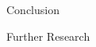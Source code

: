 \documentclass{beamer}
\begin{document}



\begin{frame}{Conclusion}
\end{frame}

\begin{frame}{Further Research}
\end{frame}
\end{document}

